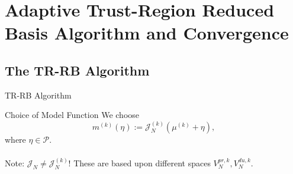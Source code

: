 \section{Adaptive Trust-Region Reduced Basis Algorithm and Convergence}

\subsection{The TR-RB Algorithm}

\begin{frame}{TR-RB Algorithm}
    \begin{block}{Choice of Model Function}
        We choose
        \begin{equation*}
            m^{(k)}(\eta) := \mathcal{J}_N^{(k)}(\mu^{(k)} + \eta),
        \end{equation*}
        where $\eta \in \mathcal{P}$. \\~\\

        Note: $\mathcal{J}_N \neq \mathcal{J}_N^{(k)}$! These are based upon different spaces $V_N^{pr, k}, V_N^{du, k}$.
    \end{block}
\end{frame}

